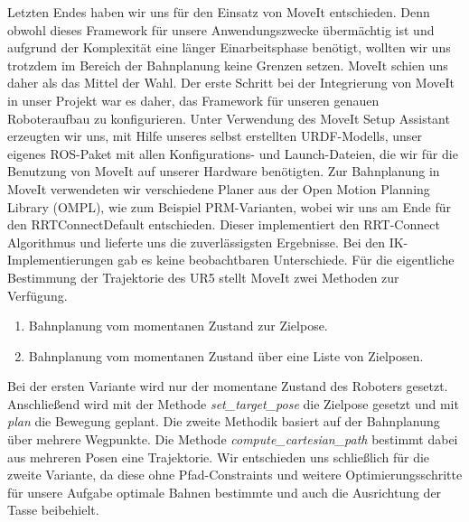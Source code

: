\newline
Letzten Endes haben wir uns für den Einsatz von MoveIt entschieden. Denn obwohl dieses Framework für unsere Anwendungszwecke übermächtig ist und aufgrund der Komplexität eine länger Einarbeitsphase benötigt, wollten wir uns trotzdem im Bereich der Bahnplanung keine Grenzen setzen. MoveIt schien uns daher als das Mittel der Wahl.
\newline
Der erste Schritt bei der Integrierung von MoveIt in unser Projekt war es daher, das Framework für unseren genauen Roboteraufbau zu konfigurieren. Unter Verwendung des MoveIt Setup Assistant \cite{MoveItAssistant} erzeugten wir uns, mit Hilfe unseres selbst erstellten URDF-Modells, unser eigenes ROS-Paket mit allen Konfigurations- und Launch-Dateien, die wir für die Benutzung von MoveIt auf unserer Hardware benötigten.
\newline
Zur Bahnplanung in MoveIt verwendeten wir verschiedene Planer aus der Open Motion Planning Library (OMPL), wie zum Beispiel PRM-Varianten, wobei wir uns am Ende für den RRTConnectDefault entschieden. Dieser implementiert den RRT-Connect Algorithmus und lieferte uns die zuverlässigsten Ergebnisse. Bei den IK-Implementierungen gab es keine beobachtbaren Unterschiede.
\newline
Für die eigentliche Bestimmung der Trajektorie des UR5 stellt MoveIt zwei Methoden zur Verfügung.
\begin{enumerate}
	\item Bahnplanung vom momentanen Zustand zur Zielpose.
	\item Bahnplanung vom momentanen Zustand über eine Liste von Zielposen.
\end{enumerate}
Bei der ersten Variante wird nur der momentane Zustand des Roboters gesetzt. Anschließend wird mit der Methode \textit{set\_target\_pose} die Zielpose gesetzt und mit \textit{plan} die Bewegung geplant. Die zweite Methodik basiert auf der Bahnplanung über mehrere Wegpunkte. Die Methode \textit{compute\_cartesian\_path} bestimmt dabei aus mehreren Posen eine Trajektorie. Wir entschieden uns schließlich für die zweite Variante, da diese ohne Pfad-Constraints und weitere Optimierungsschritte für unsere Aufgabe optimale Bahnen bestimmte und auch die Ausrichtung der Tasse beibehielt.

